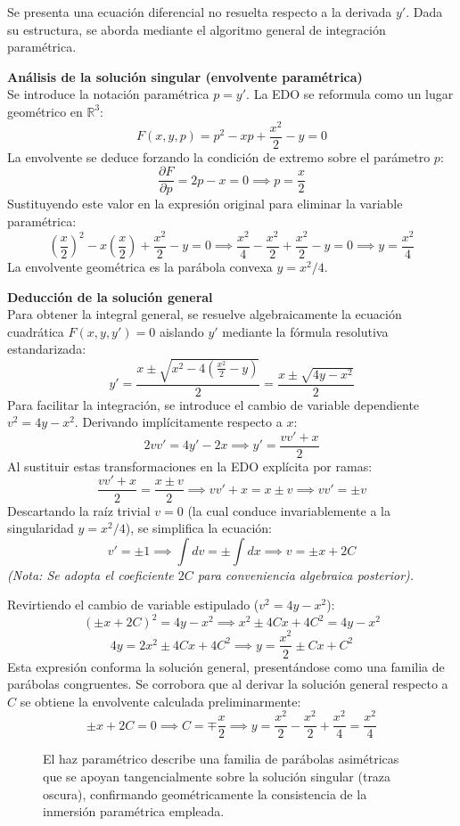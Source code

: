 \begin{tcolorbox}
Se presenta una ecuación diferencial no resuelta respecto a la derivada $y'$. Dada su estructura, se aborda mediante el algoritmo general de integración paramétrica.

\textbf{Análisis de la solución singular (envolvente paramétrica)} \\
Se introduce la notación paramétrica $p = y'$. La EDO se reformula como un lugar geométrico en $\mathbb{R}^3$:
$$ F(x,y,p) = p^2 - xp + \frac{x^2}{2} - y = 0 $$
La envolvente se deduce forzando la condición de extremo sobre el parámetro $p$:
$$ \frac{\partial F}{\partial p} = 2p - x = 0 \implies p = \frac{x}{2} $$
Sustituyendo este valor en la expresión original para eliminar la variable paramétrica:
$$ \left(\frac{x}{2}\right)^2 - x\left(\frac{x}{2}\right) + \frac{x^2}{2} - y = 0 \implies \frac{x^2}{4} - \frac{x^2}{2} + \frac{x^2}{2} - y = 0 \implies y = \frac{x^2}{4} $$
La envolvente geométrica es la parábola convexa $y = x^2/4$.

\textbf{Deducción de la solución general} \\
Para obtener la integral general, se resuelve algebraicamente la ecuación cuadrática $F(x,y,y') = 0$ aislando $y'$ mediante la fórmula resolutiva estandarizada:
$$ y' = \frac{x \pm \sqrt{x^2 - 4(\frac{x^2}{2} - y)}}{2} = \frac{x \pm \sqrt{4y - x^2}}{2} $$
Para facilitar la integración, se introduce el cambio de variable dependiente $v^2 = 4y - x^2$. Derivando implícitamente respecto a $x$:
$$ 2vv' = 4y' - 2x \implies y' = \frac{vv' + x}{2} $$
Al sustituir estas transformaciones en la EDO explícita por ramas:
$$ \frac{vv' + x}{2} = \frac{x \pm v}{2} \implies vv' + x = x \pm v \implies vv' = \pm v $$
Descartando la raíz trivial $v=0$ (la cual conduce invariablemente a la singularidad $y=x^2/4$), se simplifica la ecuación:
$$ v' = \pm 1 \implies \int dv = \pm \int dx \implies v = \pm x + 2C $$
\textit{(Nota: Se adopta el coeficiente $2C$ para conveniencia algebraica posterior).}

Revirtiendo el cambio de variable estipulado ($v^2 = 4y - x^2$):
$$ (\pm x + 2C)^2 = 4y - x^2 \implies x^2 \pm 4Cx + 4C^2 = 4y - x^2 $$
$$ 4y = 2x^2 \pm 4Cx + 4C^2 \implies y = \frac{x^2}{2} \pm Cx + C^2 $$
Esta expresión conforma la solución general, presentándose como una familia de parábolas congruentes. Se corrobora que al derivar la solución general respecto a $C$ se obtiene la envolvente calculada preliminarmente:
$$ \pm x + 2C = 0 \implies C = \mp\frac{x}{2} \implies y = \frac{x^2}{2} - \frac{x^2}{2} + \frac{x^2}{4} = \frac{x^2}{4} $$

\begin{figure}[H]
    \centering
    
    \caption{El haz paramétrico describe una familia de parábolas asimétricas que se apoyan tangencialmente sobre la solución singular (traza oscura), confirmando geométricamente la consistencia de la inmersión paramétrica empleada.}
\end{figure}
\end{tcolorbox}

